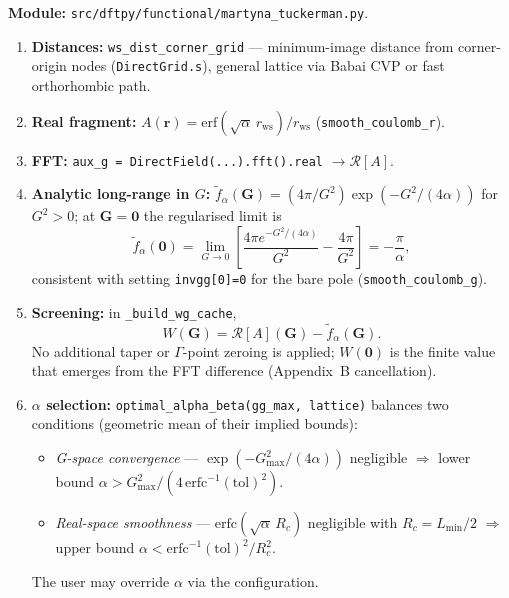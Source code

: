 \documentclass[11pt,a4paper]{article}
\begin{document}
\textbf{Module:} \texttt{src/dftpy/functional/martyna\_tuckerman.py}.

\begin{enumerate}
  \item \textbf{Distances:} \texttt{ws\_dist\_corner\_grid} --- minimum-image distance from
        corner-origin nodes (\texttt{DirectGrid.s}), general lattice via Babai CVP or fast
        orthorhombic path.
  \item \textbf{Real fragment:} $A(\mathbf r)=\mathrm{erf}(\sqrt{\alpha}\,r_{\mathrm{ws}})/r_{\mathrm{ws}}$
        (\texttt{smooth\_coulomb\_r}).
  \item \textbf{FFT:} \texttt{aux\_g = DirectField(...).fft().real} $\to \mathcal{R}[A]$.
  \item \textbf{Analytic long-range in $G$:}
        $\tilde f_\alpha(\mathbf G)= (4\pi/G^2)\exp(-G^2/(4\alpha))$ for $G^2>0$;
        at $\mathbf G=\mathbf 0$ the regularised limit is
        \begin{equation}
          \tilde f_\alpha(\mathbf 0) = \lim_{G\to 0}\left[
            \frac{4\pi e^{-G^2/(4\alpha)}}{G^2} - \frac{4\pi}{G^2}\right]
          = -\frac{\pi}{\alpha},
        \end{equation}
        consistent with setting \texttt{invgg[0]=0} for the bare pole
        (\texttt{smooth\_coulomb\_g}).
  \item \textbf{Screening:} in \texttt{\_build\_wg\_cache},
        \begin{equation}
          W(\mathbf G) = \mathcal{R}[A](\mathbf G) - \tilde f_\alpha(\mathbf G).
        \end{equation}
        No additional taper or $\Gamma$-point zeroing is applied; $W(\mathbf 0)$ is the
        finite value that emerges from the FFT difference (Appendix~B cancellation).
  \item \textbf{$\alpha$ selection:} \texttt{optimal\_alpha\_beta(gg\_max, lattice)}
        balances two conditions (geometric mean of their implied bounds):
        \begin{itemize}
          \item \emph{G-space convergence} --- $\exp(-G^2_{\max}/(4\alpha))$ negligible
                $\Rightarrow$ lower bound $\alpha > G^2_{\max}/(4\,\mathrm{erfc}^{-1}(\mathrm{tol})^2)$.
          \item \emph{Real-space smoothness} --- $\mathrm{erfc}(\sqrt\alpha\,R_c)$ negligible
                with $R_c=L_{\min}/2$ $\Rightarrow$ upper bound
                $\alpha < \mathrm{erfc}^{-1}(\mathrm{tol})^2/R_c^2$.
        \end{itemize}
        The user may override $\alpha$ via the configuration.
\end{enumerate}
\end{document}
